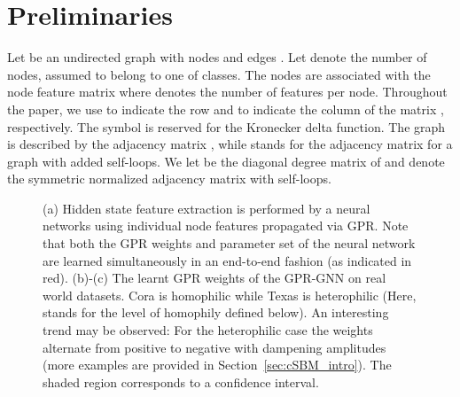\documentclass{article} \usepackage{iclr2021_conference,times}
\begin{document}
\section{Preliminaries}\label{sec:prelim}

Let  be an undirected graph with nodes  and edges . Let  denote the number of nodes, assumed to belong to one of  classes. The nodes are associated with the node feature matrix  where  denotes the number of features per node. Throughout the paper, we use  to indicate the  row and  to indicate the  column of the matrix , respectively. The symbol  is reserved for the Kronecker delta function. The graph  is described by the adjacency matrix , while  stands for the adjacency matrix for a graph with added self-loops. We let  be the diagonal degree matrix of  and  denote the symmetric normalized adjacency matrix with self-loops.


\begin{figure*}[t]
  \centering
  \caption{(a) Hidden state feature extraction is performed by a neural networks using individual node features propagated via GPR. Note that both the GPR weights  and parameter set  of the neural network are learned simultaneously in an end-to-end fashion (as indicated in red). (b)-(c) The learnt GPR weights of the GPR-GNN on real world datasets. Cora is homophilic while Texas is heterophilic (Here,  stands for the level of homophily defined below). An interesting trend may be observed: For the heterophilic case the weights alternate from positive to negative with dampening amplitudes (more examples are provided in Section~\ref{sec:cSBM_intro}). The shaded region corresponds to a  confidence interval.} \label{fig:GPR-GNN}
  \vspace{-0.4cm}
\end{figure*}
\end{document}
